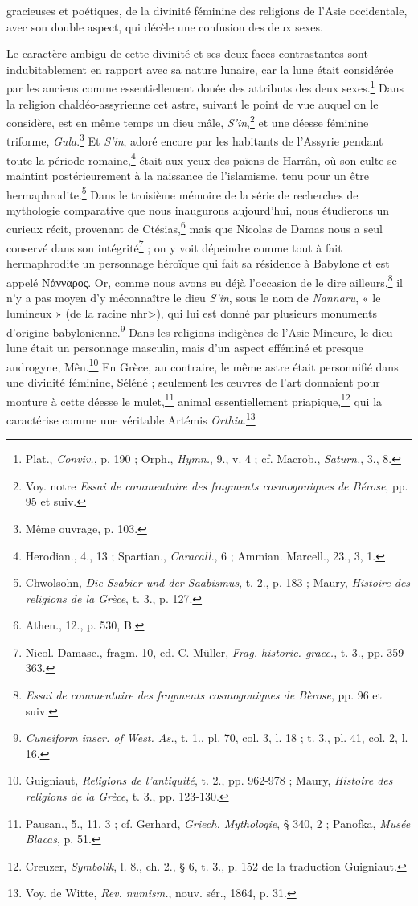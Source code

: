 \documentclass[a4paper, 11pt, oneside]{article}
\begin{document}
gracieuses et poétiques, de la divinité féminine des religions de l'Asie occidentale, avec son double aspect, qui décèle une confusion des deux sexes.

Le caractère ambigu de cette divinité et ses deux faces contrastantes sont indubitablement en rapport avec sa nature lunaire, car la lune était considérée par les anciens comme essentiellement douée des attributs des deux sexes.\footnote{Plat., \emph{Conviv.}, p. 190 ; Orph., \emph{Hymn.}, 9., v. 4 ; cf. Macrob., \emph{Saturn.}, 3., 8.} Dans la religion chaldéo-assyrienne cet astre, suivant le point de vue auquel on le considère, est en même temps un dieu mâle, \emph{S'in},\footnote{Voy. notre \emph{Essai de commentaire des fragments cosmogoniques de Bérose}, pp. 95 et suiv.} et une déesse féminine triforme, \emph{Gula}.\footnote{Même ouvrage, p. 103.} Et \emph{S'in}, adoré encore par les habitants de l'Assyrie pendant toute la période romaine,\footnote{Herodian., 4., 13 ; Spartian., \emph{Caracall.}, 6 ; Ammian. Marcell., 23., 3, 1.} était aux yeux des païens de Harrân, où son culte se maintint postérieurement à la naissance de l'islamisme, tenu pour un être hermaphrodite.\footnote{Chwolsohn, \emph{Die Ssabier und der Saabismus}, t. 2., p. 183 ; Maury, \emph{Histoire des religions de la Grèce}, t. 3., p. 127.} Dans le troisième mémoire de la série de recherches de mythologie comparative que nous inaugurons aujourd'hui, nous étudierons un curieux récit, provenant de Ctésias,\footnote{Athen., 12., p. 530, B.} mais que Nicolas de Damas nous a seul conservé dans son intégrité\footnote{Nicol. Damasc., fragm. 10, ed. C. Müller, \emph{Frag. historic. graec.}, t. 3., pp. 359-363.} ; on y voit dépeindre comme tout à fait hermaphrodite un personnage héroïque qui fait sa résidence à Babylone et est appelé Νἁνναρος. Or, comme nous avons eu déjà l'occasion de le dire ailleurs,\footnote{\emph{Essai de commentaire des fragments cosmogoniques de Bèrose}, pp. 96 et suiv.} il n'y a pas moyen d'y méconnaître le dieu \emph{S'in}, sous le nom de \emph{Nannaru}, « le lumineux » (de la racine \<nhr>), qui lui est donné par plusieurs monuments d'origine babylonienne.\footnote{\emph{Cuneiform inscr. of West. As.}, t. 1., pl. 70, col. 3, l. 18 ; t. 3., pl. 41, col. 2, l. 16.} Dans les religions indigènes de l'Asie Mineure, le dieu-lune était un personnage masculin, mais d'un aspect efféminé et presque androgyne, Mên.\footnote{Guigniaut, \emph{Religions de l'antiquité}, t. 2., pp. 962-978 ; Maury, \emph{Histoire des religions de la Grèce}, t. 3., pp. 123-130.} En Grèce, au contraire, le même astre était personnifié dans une divinité féminine, Séléné ; seulement les œuvres de l'art donnaient pour monture à cette déesse le mulet,\footnote{Pausan., 5., 11, 3 ; cf. Gerhard, \emph{Griech. Mythologie}, § 340, 2 ; Panofka, \emph{Musée Blacas}, p. 51.} animal essentiellement priapique,\footnote{Creuzer, \emph{Symbolik}, l. 8., ch. 2., § 6, t. 3., p. 152 de la traduction Guigniaut.} qui la caractérise comme une véritable Artémis \emph{Orthia}.\footnote{Voy. de Witte, \emph{Rev. numism.}, nouv. sér., 1864, p. 31.}
\end{document}
